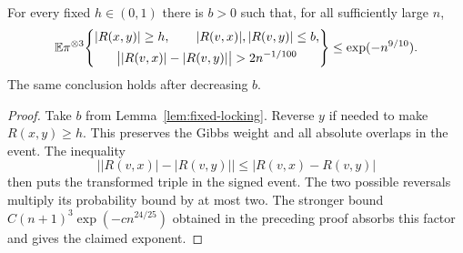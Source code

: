 \begin{proposition}
\label{static-prop:locking}
For every fixed $h\in(0,1)$ there is $b>0$ such that, for all
sufficiently large $n$,
\begin{equation}\label{static-eq:locking-probability}
 \E\pi^{\otimes3}\!\left\{
 \begin{gathered}
 |R(x,y)|\ge h,\qquad |R(v,x)|,|R(v,y)|\le b,\\
 \bigl||R(v,x)|-|R(v,y)|\bigr|>2n^{-1/100}
 \end{gathered}\right\}\le \exp(-n^{9/10}).
\end{equation}
The same conclusion holds after decreasing $b$.
\end{proposition}
\begin{proof}
Take $b$ from Lemma~\ref{lem:fixed-locking}. Reverse $y$ if needed to
make $R(x,y)\ge h$. This preserves the Gibbs weight and all absolute
overlaps in the event. The inequality
\[
 \bigl||R(v,x)|-|R(v,y)|\bigr|
       \le |R(v,x)-R(v,y)|
\]
then puts the transformed triple in the signed event. The two possible
reversals multiply its probability bound by at most two. The stronger
bound $C(n+1)^3\exp(-c n^{24/25})$ obtained in the preceding proof
absorbs this factor and gives the claimed exponent.
\end{proof}
